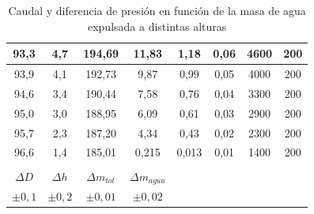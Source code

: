 \documentclass[a4paper,12pt,spanish]{article}
\begin{document}
\begin{table}[H]
\begin{tabular}{cccccccc}
			\multicolumn{1}{|c|}{93,3} & \multicolumn{1}{c|}{4,7} & \multicolumn{1}{c|}{194,69} & \multicolumn{1}{c|}{11,83} & \multicolumn{1}{c|}{1,18} & \multicolumn{1}{c|}{0,06} & \multicolumn{1}{c|}{4600} & \multicolumn{1}{c|}{200} \\ \hline
			\multicolumn{1}{|c|}{93,9} & \multicolumn{1}{c|}{4,1} & \multicolumn{1}{c|}{192,73} & \multicolumn{1}{c|}{9,87} & \multicolumn{1}{c|}{0,99} & \multicolumn{1}{c|}{0,05} & \multicolumn{1}{c|}{4000} & \multicolumn{1}{c|}{200} \\ \hline
			\multicolumn{1}{|c|}{94,6} & \multicolumn{1}{c|}{3,4} & \multicolumn{1}{c|}{190,44} & \multicolumn{1}{c|}{7,58} & \multicolumn{1}{c|}{0,76} & \multicolumn{1}{c|}{0,04} & \multicolumn{1}{c|}{3300} & \multicolumn{1}{c|}{200} \\ \hline
			\multicolumn{1}{|c|}{95,0} & \multicolumn{1}{c|}{3,0} & \multicolumn{1}{c|}{188,95} & \multicolumn{1}{c|}{6,09} & \multicolumn{1}{c|}{0,61} & \multicolumn{1}{c|}{0,03} & \multicolumn{1}{c|}{2900} & \multicolumn{1}{c|}{200} \\ \hline
			\multicolumn{1}{|c|}{95,7} & \multicolumn{1}{c|}{2,3} & \multicolumn{1}{c|}{187,20} & \multicolumn{1}{c|}{4,34} & \multicolumn{1}{c|}{0,43} & \multicolumn{1}{c|}{0,02} & \multicolumn{1}{c|}{2300} & \multicolumn{1}{c|}{200} \\ \hline
			\multicolumn{1}{|c|}{96,6} & \multicolumn{1}{c|}{1,4} & \multicolumn{1}{c|}{185,01} & \multicolumn{1}{c|}{0,215} & \multicolumn{1}{c|}{0,013} & \multicolumn{1}{c|}{0,01} & \multicolumn{1}{c|}{1400} & \multicolumn{1}{c|}{200} \\ \hline
			\multicolumn{1}{l}{} & \multicolumn{1}{l}{} & \multicolumn{1}{l}{} & \multicolumn{1}{l}{} & \multicolumn{1}{l}{} & \multicolumn{1}{l}{} & \multicolumn{1}{l}{} & \multicolumn{1}{l}{} \\ \cline{1-4}
			\multicolumn{1}{|c|}{$\Delta D   $} & \multicolumn{1}{c|}{$\Delta h  $} & \multicolumn{1}{c|}{$\Delta m_{tot}  $} & \multicolumn{1}{c|}{$\Delta m_{agua} $} &  &  &  &  \\ \cline{1-4}
			\multicolumn{1}{|c|}{$\pm 0,1$} & \multicolumn{1}{c|}{$\pm0,2$} & \multicolumn{1}{c|}{$\pm0,01$} & \multicolumn{1}{c|}{$\pm0,02$} &  &  &  &  \\ \cline{1-4}
		\end{tabular}
		\caption{Caudal y diferencia de presión en función de la masa de agua expulsada a distintas alturas}
		\label{tab:QDeltap}
	\end{table}
	
\end{document}
